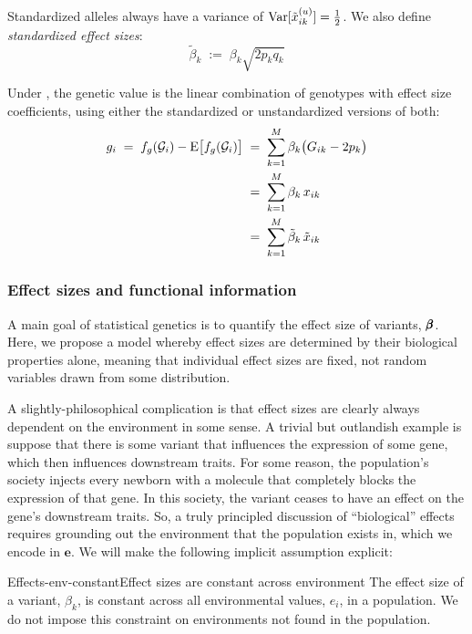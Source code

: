 \documentclass[12pt]{article}
\numberwithin{equation}{section}
\begin{document}
Standardized alleles always have a variance of $\mathrm{Var}[\tilde{x}_{ik}^{(u)}] = \tfrac12$.
We also define \emph{standardized effect sizes}:
\begin{equation}\label{eq:standardized-effect}
    \tilde{\beta}_k \;:=\; \beta_k \sqrt{2 p_k q_k}
\end{equation}

 Under , the genetic value is the linear combination of genotypes with effect size coefficients, using either the standardized or unstandardized versions of both:
\begin{equation}\label{eq:genetic-value}
\begin{aligned}
    g_i \;=\; f_g(\mathcal{G}_i) - \mathrm{E}\big[f_g(\mathcal{G}_i)\big]
    \;&=\; \sum_{k=1}^{M} \beta_k \big(G_{ik} - 2p_k\big) \\
    \;&=\; \sum_{k=1}^{M} \beta_k\, x_{ik} \\
    \;&=\; \sum_{k=1}^{M} \tilde{\beta}_k\, \tilde{x}_{ik}
\end{aligned}
\end{equation}

\subsubsection{Effect sizes and functional information}\label{sec:effect-sizes}
A main goal of statistical genetics is to quantify the effect size of variants, $\pmb{\beta}$.
Here, we propose a model whereby effect sizes are determined by their biological properties alone, meaning that individual effect sizes are fixed, not random variables drawn from some distribution.

A slightly-philosophical complication is that effect sizes are clearly always dependent on the environment in some sense.
A trivial but outlandish example is suppose that there is some variant that influences the expression of some gene, which then influences downstream traits.
For some reason, the population's society injects every newborn with a molecule that completely blocks the expression of that gene.
In this society, the variant ceases to have an effect on the gene's downstream traits.
So, a truly principled discussion of ``biological'' effects requires grounding out the environment that the population exists in, which we encode in $\mathbf{e}$.
We will make the following implicit assumption explicit:

\begin{assumption}{Effects-env-constant}{Effect sizes are constant across environment}
The effect size of a variant, $\beta_k$, is constant across all environmental values, $e_i$, in a population.
We do not impose this constraint on environments not found in the population.
\end{assumption}
\end{document}
